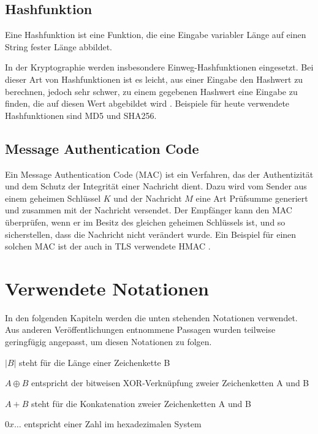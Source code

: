 
\subsection{Hashfunktion}

Eine Hashfunktion ist eine Funktion, die eine Eingabe variabler Länge auf einen String fester Länge abbildet.

In der Kryptographie werden insbesondere Einweg-Hashfunktionen eingesetzt. Bei dieser Art von Hashfunktionen ist es leicht, aus einer Eingabe den Hashwert zu berechnen, jedoch sehr schwer, zu einem gegebenen Hashwert eine Eingabe zu finden, die auf diesen Wert abgebildet wird \cite{Schneier2006}. Beispiele für heute verwendete Hashfunktionen sind MD5 und SHA256.

\subsection{Message Authentication Code}

\label{sec_mac}

Ein Message Authentication Code (MAC) ist ein Verfahren, das der Authentizität und dem Schutz der Integrität einer Nachricht dient. Dazu wird vom Sender aus einem geheimen Schlüssel \(K\) und der Nachricht \(M\) eine Art Prüfsumme generiert und zusammen mit der Nachricht versendet. Der Empfänger kann den MAC überprüfen, wenn er im Besitz des gleichen geheimen Schlüssels ist, und so sicherstellen, dass die Nachricht nicht verändert wurde. Ein Beispiel für einen solchen MAC ist der auch in TLS verwendete HMAC \cite{Schneier2006, ferguson10}.

\section{Verwendete Notationen}

In den folgenden Kapiteln werden die unten stehenden Notationen verwendet. Aus anderen Veröffentlichungen entnommene Passagen wurden teilweise geringfügig angepasst, um diesen Notationen zu folgen.

\(|B|\) steht für die Länge einer Zeichenkette B

\(A \oplus B\) entspricht der bitweisen XOR-Verknüpfung zweier Zeichenketten A und B

\(A + B\) steht für die Konkatenation zweier Zeichenketten A und B

\(0x\dots\) entspricht einer Zahl im hexadezimalen System

